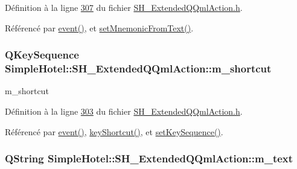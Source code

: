 Définition à la ligne \hyperlink{SH__ExtendedQQmlAction_8h_source_l00307}{307} du fichier \hyperlink{SH__ExtendedQQmlAction_8h_source}{S\-H\-\_\-\-Extended\-Q\-Qml\-Action.\-h}.



Référencé par \hyperlink{classSimpleHotel_1_1SH__ExtendedQQmlAction_af9f8858833e85282453c40556706b52a}{event()}, et \hyperlink{classSimpleHotel_1_1SH__ExtendedQQmlAction_aad36c9addcfbd2e2765cde1cd54f69b6}{set\-Mnemonic\-From\-Text()}.

\hypertarget{classSimpleHotel_1_1SH__ExtendedQQmlAction_a5522e6467ee3d0a8b7dc22a70497564c}{
\subsubsection[{m\-\_\-shortcut}]{\setlength{\rightskip}{0pt plus 5cm}Q\-Key\-Sequence Simple\-Hotel\-::\-S\-H\-\_\-\-Extended\-Q\-Qml\-Action\-::m\-\_\-shortcut\hspace{0.3cm}{\ttfamily [private]}}}\label{classSimpleHotel_1_1SH__ExtendedQQmlAction_a5522e6467ee3d0a8b7dc22a70497564c}


m\-\_\-shortcut 



Définition à la ligne \hyperlink{SH__ExtendedQQmlAction_8h_source_l00303}{303} du fichier \hyperlink{SH__ExtendedQQmlAction_8h_source}{S\-H\-\_\-\-Extended\-Q\-Qml\-Action.\-h}.



Référencé par \hyperlink{classSimpleHotel_1_1SH__ExtendedQQmlAction_af9f8858833e85282453c40556706b52a}{event()}, \hyperlink{classSimpleHotel_1_1SH__ExtendedQQmlAction_a477ddaee93b9ed008c155f11397a0b16}{key\-Shortcut()}, et \hyperlink{classSimpleHotel_1_1SH__ExtendedQQmlAction_aaf4ee351bd2af1519c7e671407577d80}{set\-Key\-Sequence()}.

\hypertarget{classSimpleHotel_1_1SH__ExtendedQQmlAction_a016b946c3a6c27e759e541ced2357caa}{
\subsubsection[{m\-\_\-text}]{\setlength{\rightskip}{0pt plus 5cm}Q\-String Simple\-Hotel\-::\-S\-H\-\_\-\-Extended\-Q\-Qml\-Action\-::m\-\_\-text\hspace{0.3cm}{\ttfamily [private]}}}\label{classSimpleHotel_1_1SH__ExtendedQQmlAction_a016b946c3a6c27e759e541ced2357caa}


